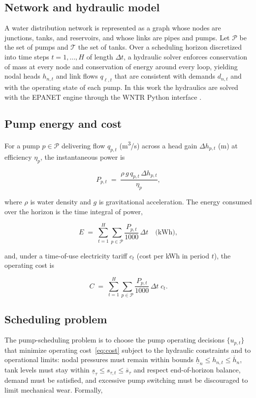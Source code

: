 \documentclass[11pt,a4paper]{article}
\begin{document}
\subsection{Network and hydraulic model}
A water distribution network is represented as a graph whose nodes are junctions,
tanks, and reservoirs, and whose links are pipes and pumps. Let $\mathcal{P}$ be
the set of pumps and $\mathcal{T}$ the set of tanks. Over a scheduling horizon
discretized into time steps $t = 1,\dots,H$ of length $\Delta t$, a hydraulic
solver enforces conservation of mass at every node and conservation of energy
around every loop, yielding nodal heads $h_{n,t}$ and link flows $q_{\ell,t}$
that are consistent with demands $d_{n,t}$ and with the operating state of each
pump. In this work the hydraulics are solved with the EPANET engine
\citep{Rossman2000EPANET} through the WNTR Python interface
\citep{Klise2017WNTR}.

\subsection{Pump energy and cost}
For a pump $p \in \mathcal{P}$ delivering flow $q_{p,t}$ (m\textsuperscript{3}/s)
across a head gain $\Delta h_{p,t}$ (m) at efficiency $\eta_p$, the instantaneous
power is

\begin{equation}
\label{eq:power}
P_{p,t} \;=\; \frac{\rho\, g\, q_{p,t}\, \Delta h_{p,t}}{\eta_p},
\end{equation}

where $\rho$ is water density and $g$ is gravitational acceleration. The energy
consumed over the horizon is the time integral of power,

\begin{equation}
\label{eq:energy}
E \;=\; \sum_{t=1}^{H} \sum_{p \in \mathcal{P}}
\frac{P_{p,t}}{1000}\,\Delta t \quad \text{(kWh)},
\end{equation}

and, under a time-of-use electricity tariff $c_t$ (cost per kWh in period $t$),
the operating cost is

\begin{equation}
\label{eq:cost}
C \;=\; \sum_{t=1}^{H} \sum_{p \in \mathcal{P}}
\frac{P_{p,t}}{1000}\,\Delta t\; c_t .
\end{equation}

\subsection{Scheduling problem}
The pump-scheduling problem is to choose the pump operating decisions
$\{u_{p,t}\}$ that minimize operating cost~\eqref{eq:cost} subject to the
hydraulic constraints and to operational limits: nodal pressures must remain
within bounds $\underline{h}_n \le h_{n,t} \le \overline{h}_n$, tank levels must
stay within $\underline{s}_\tau \le s_{\tau,t} \le \overline{s}_\tau$ and respect
end-of-horizon balance, demand must be satisfied, and excessive pump switching
must be discouraged to limit mechanical wear. Formally,
\end{document}
